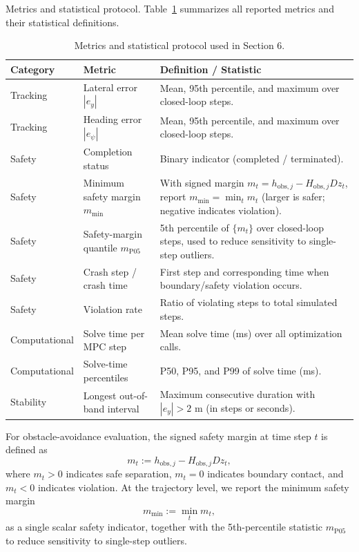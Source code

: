 \documentclass[pdflatex,sn-mathphys,Numbered]{sn-jnl}
\numberwithin{equation}{section}
\begin{document}
	Metrics and statistical protocol. Table~\ref{tab:metrics_protocol} summarizes all reported metrics and their statistical definitions.
	
	\begin{table}[htbp]
		\centering
		\caption{Metrics and statistical protocol used in Section 6.}
		\label{tab:metrics_protocol}
		\scriptsize
		\setlength{\tabcolsep}{2pt}
		\begin{tabularx}{\columnwidth}{>{\raggedright\arraybackslash}p{} >{\raggedright\arraybackslash}p{} >{\raggedright\arraybackslash}X}
			\toprule
			\textbf{Category} & \textbf{Metric} & \textbf{Definition / Statistic} \\
			\midrule
			Tracking & Lateral error $|e_y|$ & Mean, 95th percentile, and maximum over closed-loop steps. \\
			Tracking & Heading error $|e_\psi|$ & Mean, 95th percentile, and maximum over closed-loop steps. \\
			Safety & Completion status & Binary indicator (completed / terminated). \\
			Safety & Minimum safety margin $m_{\min}$ & With signed margin $m_t = h_{\mathrm{obs},j} - H_{\mathrm{obs},j}Dz_t$, report $m_{\min}=\min_t m_t$ (larger is safer; negative indicates violation). \\
			Safety & Safety-margin quantile $m_{\mathrm{P05}}$ & 5th percentile of $\{m_t\}$ over closed-loop steps, used to reduce sensitivity to single-step outliers. \\
			Safety & Crash step / crash time & First step and corresponding time when boundary/safety violation occurs. \\
			Safety & Violation rate & Ratio of violating steps to total simulated steps. \\
			Computational & Solve time per MPC step & Mean solve time (ms) over all optimization calls. \\
			Computational & Solve-time percentiles & P50, P95, and P99 of solve time (ms). \\
			Stability & Longest out-of-band interval & Maximum consecutive duration with $|e_y|>2$ m (in steps or seconds). \\
			\bottomrule
		\end{tabularx}
	\end{table}
	
	For obstacle-avoidance evaluation, the signed safety margin at time step $t$ is defined as
	\begin{equation}
	\label{equ:signed_safety_margin}
	m_t := h_{\mathrm{obs},j} - H_{\mathrm{obs},j} D z_t,
	\end{equation}
	where $m_t>0$ indicates safe separation, $m_t=0$ indicates boundary contact, and $m_t<0$ indicates violation. At the trajectory level, we report the minimum safety margin
	\begin{equation}
	\label{equ:min_safety_margin}
	m_{\min}:=\min_t m_t,
	\end{equation}
	as a single scalar safety indicator, together with the 5th-percentile statistic $m_{\mathrm{P05}}$ to reduce sensitivity to single-step outliers.
	
\end{document}

